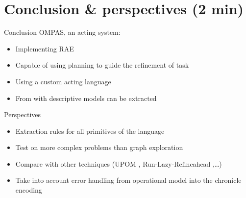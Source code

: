\section{Conclusion \& perspectives (2 min)}
\begin{frame}[c]{Conclusion}
    OMPAS, an acting system:
    \pause
        \begin{itemize}
            \item Implementing RAE
            \item Capable of using planning to guide the refinement of task
            \item Using a custom acting language
            \item From with descriptive models can be extracted
        \end{itemize}    
\end{frame}

\begin{frame}[c]{Perspectives}
    \begin{itemize}
        \item Extraction rules for all primitives of the language
        \pause
        \item Test on more complex problems than graph exploration
        \pause
        \item Compare with other techniques (UPOM \cite{patraIntegratingActingPlanning2020}, Run-Lazy-Refineahead \cite{bansod2021integrating},\dots)
        \pause
        \item Take into account error handling from operational model into the chronicle encoding
    \end{itemize}
\end{frame}